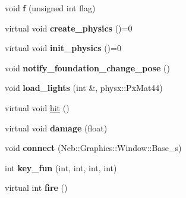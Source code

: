 \begin{DoxyCompactItemize}
\item 
\hypertarget{classNeb_1_1Actor_1_1Base_a400c04ba14166e7e399630c576f626eb}{void {\bfseries f} (unsigned int flag)}\label{classNeb_1_1Actor_1_1Base_a400c04ba14166e7e399630c576f626eb}

\item 
\hypertarget{classNeb_1_1Actor_1_1Base_ae5649ec4e6bae0235f5056f8ef877f6e}{virtual void {\bfseries create\-\_\-physics} ()=0}\label{classNeb_1_1Actor_1_1Base_ae5649ec4e6bae0235f5056f8ef877f6e}

\item 
\hypertarget{classNeb_1_1Actor_1_1Base_a84a52d4a51117c510336bcad075f63d1}{virtual void {\bfseries init\-\_\-physics} ()=0}\label{classNeb_1_1Actor_1_1Base_a84a52d4a51117c510336bcad075f63d1}

\item 
\hypertarget{classNeb_1_1Actor_1_1Base_a5b5263db439a6cc2614268dd9058d302}{void {\bfseries notify\-\_\-foundation\-\_\-change\-\_\-pose} ()}\label{classNeb_1_1Actor_1_1Base_a5b5263db439a6cc2614268dd9058d302}

\item 
\hypertarget{classNeb_1_1Actor_1_1Base_a1952504069949fa29f53137cfe762274}{void {\bfseries load\-\_\-lights} (int \&, physx\-::\-Px\-Mat44)}\label{classNeb_1_1Actor_1_1Base_a1952504069949fa29f53137cfe762274}

\item 
virtual void \hyperlink{classNeb_1_1Actor_1_1Base_afc072654755bb4db2e1af77a55e7f8dd}{hit} ()
\item 
\hypertarget{classNeb_1_1Actor_1_1Base_aa8065352d9f093036db30ea7a4e04828}{virtual void {\bfseries damage} (float)}\label{classNeb_1_1Actor_1_1Base_aa8065352d9f093036db30ea7a4e04828}

\item 
\hypertarget{classNeb_1_1Actor_1_1Base_a9baf846b3bc20d710597cfa8245b4b3c}{void {\bfseries connect} (\-Neb\-::\-Graphics\-::\-Window\-::\-Base\-\_\-s)}\label{classNeb_1_1Actor_1_1Base_a9baf846b3bc20d710597cfa8245b4b3c}

\item 
\hypertarget{classNeb_1_1Actor_1_1Base_a02cc601e428cea2f36c5b8f58bf31749}{int {\bfseries key\-\_\-fun} (int, int, int, int)}\label{classNeb_1_1Actor_1_1Base_a02cc601e428cea2f36c5b8f58bf31749}

\item 
\hypertarget{classNeb_1_1Actor_1_1Base_aa7001c8845e41342c9b01a190c6026a1}{virtual int {\bfseries fire} ()}\label{classNeb_1_1Actor_1_1Base_aa7001c8845e41342c9b01a190c6026a1}


\end{DoxyCompactItemize}
